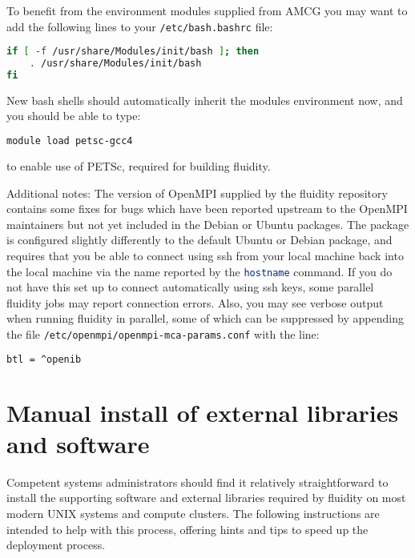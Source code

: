 To benefit from the environment modules supplied from AMCG you may want to add
the following lines to your \lstinline[language=bash]+/etc/bash.bashrc+ file:

\begin{lstlisting}[language=bash]
if [ -f /usr/share/Modules/init/bash ]; then
    . /usr/share/Modules/init/bash
fi
\end{lstlisting}

New bash shells should automatically inherit the modules environment now, and
you should be able to type:

\begin{lstlisting}[language=bash]
module load petsc-gcc4
\end{lstlisting}

to enable use of PETSc, required for building fluidity.
 
Additional notes: The version of OpenMPI supplied by the fluidity repository
contains some fixes for bugs which have been reported upstream to the OpenMPI
maintainers but not yet included in the Debian or Ubuntu packages. The package
is configured slightly differently to the default Ubuntu or Debian package, and
requires that you be able to connect using ssh from your local machine back
into the local machine via the name reported by the
\lstinline[language=bash]+hostname+ command. If you do not have this set up to
connect automatically using ssh keys, some parallel fluidity jobs may report
connection errors. Also, you may see verbose output when running fluidity in
parallel, some of which can be suppressed by appending the file
\lstinline[language=bash]+/etc/openmpi/openmpi-mca-params.conf+ with the line:

\begin{lstlisting}[language=bash]
btl = ^openib
\end{lstlisting}

\section{Manual install of external libraries and software}
\label{sect:required_ḻibraries_manual_install}

Competent systems administrators should find it relatively straightforward to
install the supporting software and external libraries required by fluidity on
most modern UNIX systems and compute clusters. The following instructions are
intended to help with this process, offering hints and tips to speed up the
deployment process.

